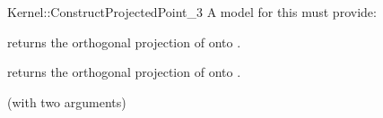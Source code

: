 \begin{ccRefFunctionObjectConcept}{Kernel::ConstructProjectedPoint_3}
A model for this must provide:


       {returns the orthogonal projection of  onto .}

       {returns the orthogonal projection of  onto .}

\ccRefines
{} (with two arguments)

\ccSeeAlso
{} \\
 \\

\end{ccRefFunctionObjectConcept}
